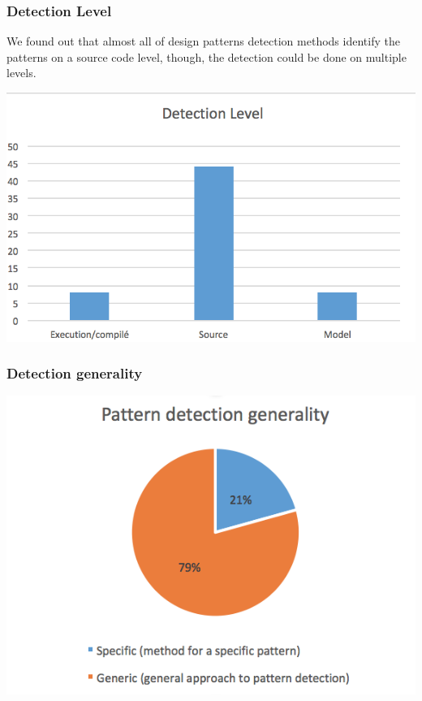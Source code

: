 \documentclass[letterpaper, 10 pt, conference]{ieeeconf}  %
\begin{document}
\subsubsection{Detection Level}
We found out that almost all of design patterns detection methods 
identify the patterns on a source code level, though, the detection could
be done on multiple levels.
\begin{center}
\includegraphics[scale=0.75]{detection_level.png}
\end{center}


\subsubsection{Detection generality}

\begin{center}
\includegraphics[scale=0.75]{detection_generality.png}
\end{center}
\end{document}
